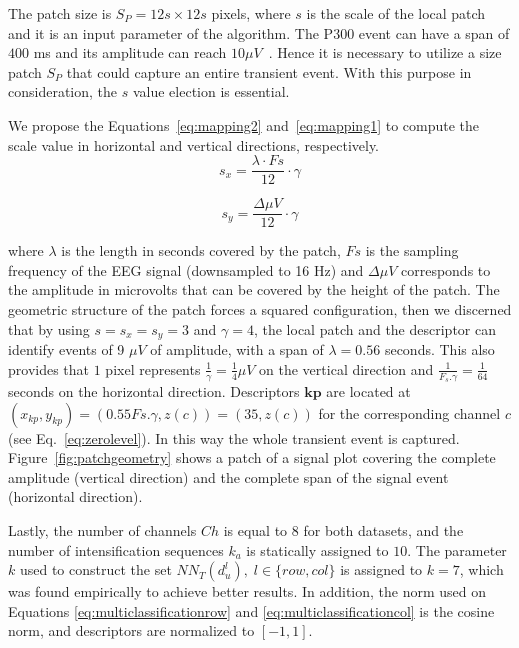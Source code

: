 \documentclass[utf8]{frontiersSCNS} %
\begin{document}
The patch size is $S_P = 12s \times 12s$ pixels, where $s$ is the scale of the local patch and it is an input parameter of the algorithm. The P300 event can have a span of $400$ ms and its amplitude can reach $ 10 \mu V $~\citep{Rao2013}.  Hence it is necessary to utilize a size patch $S_P$ that could capture an entire transient event. With this purpose in consideration, the $s$ value election is essential.

We propose the Equations~\ref{eq:mapping2} and~\ref{eq:mapping1} to compute the scale value in horizontal and vertical directions, respectively. 
\begin{equation}
s_x = \frac{\lambda \cdot Fs}{12} \cdot \gamma
\label{eq:mapping2}
\end{equation}

\begin{equation}
s_y= \frac{\Delta \mu V}{12} \cdot \gamma 
\label{eq:mapping1}
\end{equation}


\noindent where $ \lambda $ is the length in seconds covered by the patch, $ Fs $ is the sampling frequency of the EEG signal (downsampled to 16 Hz) and  $\Delta  \mu V $ corresponds to the amplitude in microvolts that can be covered by the height of the patch. The geometric structure of the patch forces a squared configuration, then we discerned that by using $ s =s_x =s_y = 3 $ and $ \gamma = 4 $,  the local patch and the descriptor can identify events of 9 $ \mu V $ of amplitude, with a span of $ \lambda = 0.56$ seconds.  This also provides that $ 1 $ pixel represents $ \frac{1}{\gamma}= \frac{1}{4} \mu V $ on the vertical direction and $\frac{1}{F_s.\gamma}=\frac{1}{64}$ seconds on the horizontal direction. Descriptors  $\mathbf{kp}$  are located at $ (x_{kp}, y_{kp} )= ( 0.55 Fs.\gamma, z(c) )= (35,  z(c)) $ for the corresponding channel $c$ (see Eq.~\ref{eq:zerolevel}).   In this way the whole transient event is captured. 
Figure~\ref{fig:patchgeometry} shows a patch of a signal plot covering the complete amplitude (vertical direction) and the complete span of the signal event (horizontal direction). 

Lastly, the number of channels $Ch$ is equal to $8$ for both datasets, and the number of intensification sequences $k_a$ is statically assigned to $10$.  The parameter $k$ used to construct the set $NN_T(d^l_u), \;l\in\{row,{col}\}$ is assigned to $k=7$, which was found empirically to achieve better results.  In addition, the norm used on  Equations \ref{eq:multiclassificationrow} and \ref{eq:multiclassificationcol} is the cosine norm, and descriptors are normalized to $ \left[ -1, 1 \right] $.
\end{document}
